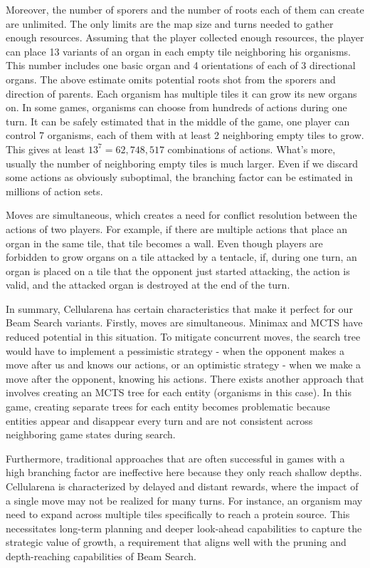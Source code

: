 \documentclass[shortabstract, mgr, english]{iithesis}
\begin{document}
Moreover, the number of sporers and the number of roots each of them can create are unlimited. The only limits are the map size and turns needed to gather enough resources. Assuming that the player collected enough resources, the player can place 13 variants of an organ in each empty tile neighboring his organisms. This number includes one basic organ and 4 orientations of each of 3 directional organs. The above estimate omits potential roots shot from the sporers and direction of parents. Each organism has multiple tiles it can grow its new organs on. In some games, organisms can choose from hundreds of actions during one turn. It can be safely estimated that in the middle of the game, one player can control 7 organisms, each of them with at least 2 neighboring empty tiles to grow. This gives at least $13^7=62,748,517$ combinations of actions. What's more, usually the number of neighboring empty tiles is much larger. Even if we discard some actions as obviously suboptimal, the branching factor can be estimated in millions of action sets.

Moves are simultaneous, which creates a need for conflict resolution between the actions of two players. For example, if there are multiple actions that place an organ in the same tile, that tile becomes a wall. Even though players are forbidden to grow organs on a tile attacked by a tentacle, if, during one turn, an organ is placed on a tile that the opponent just started attacking, the action is valid, and the attacked organ is destroyed at the end of the turn.

In summary, Cellularena has certain characteristics that make it perfect for our Beam Search variants. Firstly, moves are simultaneous. Minimax and MCTS have reduced potential in this situation. To mitigate concurrent moves, the search tree would have to implement a pessimistic strategy - when the opponent makes a move after us and knows our actions, or an optimistic strategy - when we make a move after the opponent, knowing his actions. There exists another approach that involves creating an MCTS tree for each entity (organisms in this case). In this game, creating separate trees for each entity becomes problematic because entities appear and disappear every turn and are not consistent across neighboring game states during search.

Furthermore, traditional approaches that are often successful in games with a high branching factor are ineffective here because they only reach shallow depths. Cellularena is characterized by delayed and distant rewards, where the impact of a single move may not be realized for many turns. For instance, an organism may need to expand across multiple tiles specifically to reach a protein source. This necessitates long-term planning and deeper look-ahead capabilities to capture the strategic value of growth, a requirement that aligns well with the pruning and depth-reaching capabilities of Beam Search.
\end{document}
